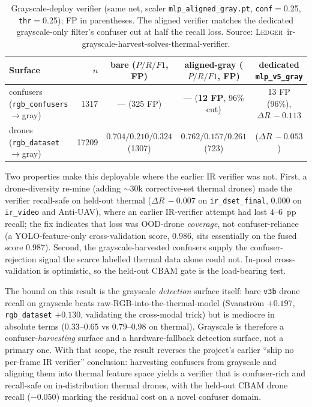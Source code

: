 \documentclass[12pt,a4paper,oneside,openright]{book}
\begin{document}
\begin{table}[htbp]
    \centering
    \caption{Grayscale-deploy verifier (same net, scaler \texttt{mlp\_aligned\_gray.pt}, \texttt{conf}$=$0.25, \texttt{thr}$=$0.25); FP in parentheses. The aligned verifier matches the dedicated grayscale-only filter's confuser cut at half the recall loss. Source: \textsc{Ledger}~ir-grayscale-harvest-solves-thermal-verifier.}
    \label{tab:ir_aligned_gray}
    \begin{tabular}{lrccc}
        \toprule
        Surface & $n$ & bare ($P/R/F1$, FP) & aligned-gray ($P/R/F1$, FP) & dedicated \texttt{mlp\_v5\_gray} \\
        \midrule
        confusers (\texttt{rgb\_confusers}$\to$gray) & 1317  & --- (325 FP) & --- (\textbf{12 FP}, 96\% cut) & 13 FP (96\%), $\Delta R\,{-}0.113$ \\
        drones (\texttt{rgb\_dataset}$\to$gray)      & 17209 & $0.704/0.210/0.324$ (1307) & $0.762/0.157/0.261$ (723) & ($\Delta R\,{-}0.053$) \\
        \bottomrule
    \end{tabular}
\end{table}

Two properties make this deployable where the earlier IR verifier was not. First, a drone-diversity re-mine (adding $\sim$30k corrective-set thermal drones) made the verifier recall-safe on held-out thermal ($\Delta R\,{-}0.007$ on \texttt{ir\_dset\_final}, $0.000$ on \texttt{ir\_video} and Anti-UAV), where an earlier IR-verifier attempt had lost $4$--$6$~pp recall; the fix indicates that loss was OOD-drone \emph{coverage}, not confuser-reliance (a YOLO-feature-only cross-validation score, $0.986$, sits essentially on the fused score $0.987$). Second, the grayscale-harvested confusers supply the confuser-rejection signal the scarce labelled thermal data alone could not. In-pool cross-validation is optimistic, so the held-out CBAM gate is the load-bearing test.

The bound on this result is the grayscale \emph{detection} surface itself: bare \texttt{v3b} drone recall on grayscale beats raw-RGB-into-the-thermal-model (Svanstr\"om $+0.197$, \texttt{rgb\_dataset} $+0.130$, validating the cross-modal trick) but is mediocre in absolute terms ($0.33$--$0.65$ vs $0.79$--$0.98$ on thermal). Grayscale is therefore a confuser-\emph{harvesting} surface and a hardware-fallback detection surface, not a primary one. With that scope, the result reverses the project's earlier ``ship no per-frame IR verifier'' conclusion: harvesting confusers from grayscale and aligning them into thermal feature space yields a verifier that is confuser-rich and recall-safe on in-distribution thermal drones, with the held-out CBAM drone recall ($-0.050$) marking the residual cost on a novel confuser domain.
\end{document}
